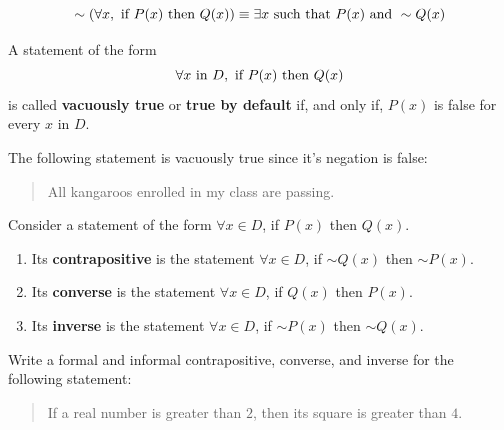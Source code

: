 \documentclass[../mathNotesPreamble]{subfiles}
\begin{document}
  \begin{thmBox*}
    \[\sim{\left(\forall x, \textnormal{ if } P(x) \textnormal{ then } Q(x)\right)} \equiv \exists x\textnormal{ such that } P(x) \textnormal{ and } \sim Q(x)\]
  \end{thmBox*}

  \begin{defn*}
    A statement of the form
      \[\forall x \textnormal{ in } D, \textnormal{ if } P(x) \textnormal{ then } Q(x)\]
    is called \textbf{vacuously true} or \textbf{true by default} if, and only if, $P(x)$ is false for every $x$ in $D$.
  \end{defn*}
  \begin{ex*}
    The following statement is vacuously true since it's negation is false:
    \begin{quote}
      All kangaroos enrolled in my class are passing.
    \end{quote}
    \vspace*{3\baselineskip}
  \end{ex*}
  \pagebreak

  \begin{defn*}
    Consider a statement of the form $\forall x\in D$, if $P(x)$ then $Q(x)$.
    \TabPositions{90mm}
    \begin{enumerate}
      \item Its \textbf{contrapositive} is the statement \tab $\forall x\in D$, if $\sim Q(x)$ then $\sim P(x)$.
      \item Its \textbf{converse} is the statement \tab $\forall x\in D$, if $Q(x)$ then $P(x)$.
      \item Its \textbf{inverse} is the statement \tab $\forall x\in D$, if $\sim P(x)$ then $\sim Q(x)$.
    \end{enumerate}
  \end{defn*}
  \begin{ex*}
    Write a formal and informal contrapositive, converse, and inverse for the following statement:
    \begin{quote}
      If a real number is greater than $2$, then its square is greater than $4$.
    \end{quote}
  \end{ex*}
  \pagebreak
\end{document}
